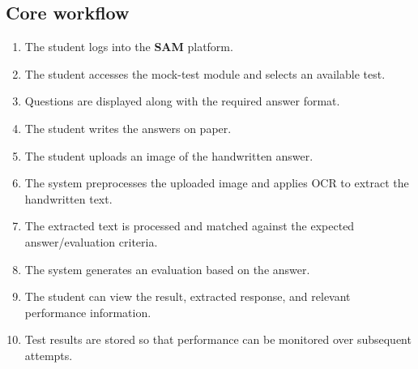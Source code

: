 \documentclass[11pt,a4paper]{article}
\begin{document}
\subsection{Core workflow}
\begin{enumerate}
    \item The student logs into the \textbf{SAM} platform.

    \item The student accesses the mock-test module and selects an available test.

    \item Questions are displayed along with the required answer format.

    \item The student writes the answers on paper.

    \item The student uploads an image of the handwritten answer.

    \item The system preprocesses the uploaded image and applies OCR to extract the handwritten text.

    \item The extracted text is processed and matched against the expected answer/evaluation criteria.

    \item The system generates an evaluation based on the answer.

    \item The student can view the result, extracted response, and relevant performance information.

    \item Test results are stored so that performance can be monitored over subsequent attempts.
\end{enumerate}
\end{document}

